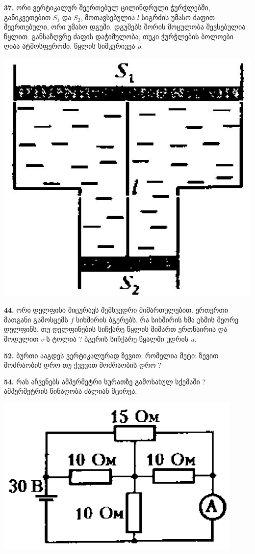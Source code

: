 \documentclass[12pt,a4paper,]{report}
\begin{document}
\textbf{37.} ორი ვერტიკალურ შეერთებულ ცილინდრული ჭურჭლებში, განიკვეთებით $S_1$ და $S_2$, მოთავსებულია $l$ სიგრძის უმასო ძაფით შეერთებული, ორი უმასო დგუში. დგუშებს შორის მოცულობა შევსებულია წყლით. განსაზღვრე ძაფის დაჭიმულობა, თუკი ჭურჭლების ბოლოები ღიაა ატმოსფეროში. წყლის სიმკვრივეა $\rho$.
		\begin{center}
			\includegraphics[scale=0.2]{images/F37.jpg}
		\end{center}

\textbf{44.} ორი დელფინი მიცურავს შემხვედრი მიმართულებით. ერთერთი მათგანი გამოსცემს $f$ სიხშირის ბგერებს. რა სიხშირის ხმა ესმის მეორე დელფინს, თუ დელფინების სიჩქარე წყლის მიმართ ერთნაირია და მოდულით $v$-ს ტოლია ? ბგერის სიჩქარე წყალში უდრის $u$.

\textbf{52.} ბურთი ააგდეს ვერტიკალურად ზევით. რომელია მეტი: ზევით მოძრაობის დრო თუ ქვევით მოძრაობის დრო ?

\textbf{54.} რას აჩვენებს ამპერმეტრი სურათზე გამოსახულ სქემაში ? ამპერმეტრის წინაღობა ძალიან მცირეა. 
		\begin{center}
			\includegraphics[scale=0.4]{images/54.png}
		\end{center}
	
\end{document}
